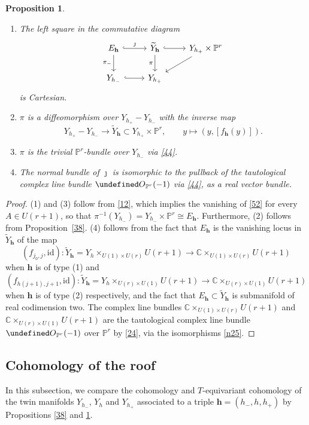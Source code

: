 \documentclass[11pt]{article}
\newtheorem{proposition}[theo]{Proposition}
\theoremstyle{definition}
\numberwithin{equation}{section}
\let\cal\undefined
\numberwithin{equation}{section}
\newcommand{\C}{\mathbb{C}}
\newcommand{\PP}{\mathbb{P}}
\newcommand{\cal}{\mathcal}
\newcommand\cO{{\cal O}}
\newcommand\tY{{\widetilde{Y}}}
\newcommand\lra{\longrightarrow }
\newcommand\beq{\begin{equation}}
\newcommand\eeq{\end{equation}}
\newcommand\bh{\mathbf{h}}
\begin{document}
\begin{proposition}\label{39} ~
\begin{enumerate}
	\item The left square in  the commutative diagram
	\[\begin{tikzcd}E_\bh\ar[r, hook, "\jmath"] \ar[d, "\pi_-", labels=left] & \tY_\bh  \ar[r, hook] \ar[d, "\pi", labels=left] & Y_{h_+}\times \PP^r \ar[ld] \\ Y_{h_-} \ar[r, hook] & Y_{h_+}&\end{tikzcd}\]
		is Cartesian.   		
		\item  $\pi$ is a diffeomorphism over $Y_{h_+}-Y_{h_-}$ with the inverse map 
		\beq Y_{h_+}-Y_{h_-}\lra \tY_\bh\subset  Y_{h_+}\times \PP^r, \qquad y\mapsto (y,[f_\bh(y)]).\eeq 
		\item $\pi$ is the trivial $\PP^r$-bundle over $Y_{h_-}$ via \eqref{44}.
		\item The normal bundle of $\jmath$ is isomorphic to the pullback of the tautological complex line bundle $\cO_{\PP^r}(-1)$ via \eqref{44}, as a real vector bundle. 
		\end{enumerate}
\end{proposition}
\begin{proof} (1) and (3) 
	follow from \eqref{12}, which implies the vanishing of \eqref{52} for every $A\in U(r+1)$, so that $\pi^{-1}(Y_{h_-})=Y_{h_-}\times \PP^r\cong E_\bh$. Furthermore, (2) follows from Proposition~\ref{38}. 
	(4) follows from the fact that $E_\bh$ is the vanishing locus in $\tY_\bh$ of the map
	\[(f_{j_0,j},\mathrm{id}):\tY_{\bh}=Y_h\times_{U(1)\times U(r)}U(r+1)\lra\C\times _{U(1)\times U(r)}U(r+1)\]
	when $\bh$ is of type (1) and
	\[(f_{h(j+1),j+1},\mathrm{id}):\tY_{\bh}=Y_h\times_{U(r)\times U(1)}U(r+1)\lra\C\times _{U(r)\times U(1)}U(r+1)\]
	when $\bh$ is of type (2) respectively, and the fact that $E_\bh\subset \tY_\bh$ is submanifold of real codimension two. The complex line bundles $\C\times _{U(1)\times U(r)}U(r+1)$ and $\C\times _{U(r)\times U(1)}U(r+1)$ are the tautological complex line bundle $\cO_{\PP^r}(-1)$ over $\PP^r$ by \eqref{24}, via the isomorphisms \eqref{n25}.
\end{proof}

\subsection{Cohomology of the roof}
In this subsection, we compare the cohomology and $T$-equivariant cohomology of  
the  twin manifolds $Y_{h_-}$, $Y_{h}$ and $Y_{h_+}$ associated to a triple $\bh=(h_-,h,h_+)$  
 by Propositions \ref{38} and \ref{39}.
\end{document}
